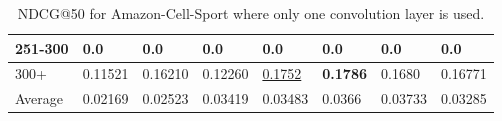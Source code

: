 \begin{table*}[]
\begin{tabular}{|l|l|l|l|l|l|l||l|}
        251-300     & 0.0                            & 0.0                            & 0.0                            & 0.0                            & 0.0                            & 0.0                             & 0.0                        \\ \hline
        300+        & 0.11521                        & 0.16210                        & 0.12260                        & \underline{0.1752}             & \textbf{0.1786}                & 0.1680                          & 0.16771                    \\ \hline
        Average     & 0.02169                        & 0.02523                        & 0.03419                        & 0.03483                        & 0.0366                         & 0.03733                         & 0.03285                    \\ \hline
    \end{tabular}
    \caption{NDCG@50 for Amazon-Cell-Sport where only one convolution layer is used.}
    \label{tab:Amazon-Cell-Sport-ndcg-evaluation}
\end{table*}

